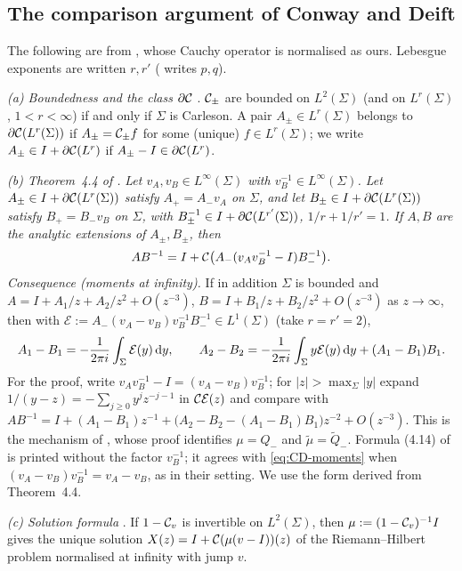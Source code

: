 \subsection{The comparison argument of Conway and Deift}\label{sec:tool-cd}

The following are from \cite[\S4]{CD}, whose Cauchy operator is normalised as ours. Lebesgue exponents are written
$r,r'$ (\cite{CD} writes $p,q$).

\emph{(a) Boundedness and the class $\partial\mathcal{C}$} \cite[\S4.1]{CD}. $\mathcal{C}_\pm$ are bounded on $L^2(\Sigma)$ (and on
$L^r(\Sigma)$, $1<r<\infty$) if and only if $\Sigma$ is Carleson. A pair $A_\pm\in L^r(\Sigma)$ belongs to
$\partial\mathcal{C}(L^r(\Sigma))$ if $A_\pm=\mathcal{C}_\pm f$ for some (unique) $f\in L^r(\Sigma)$; we write $A_\pm\in I+\partial\mathcal{C}(L^r)$ if
$A_\pm-I\in\partial\mathcal{C}(L^r)$.

\emph{(b) Theorem~4.4 of \cite{CD}.} \emph{Let $v_A,v_B\in L^\infty(\Sigma)$ with $v_B^{-1}\in L^\infty(\Sigma)$. Let
$A_\pm\in I+\partial\mathcal{C}(L^r(\Sigma))$ satisfy $A_+=A_-v_A$ on $\Sigma$, and let $B_\pm\in I+\partial\mathcal{C}(L^r(\Sigma))$ satisfy
$B_+=B_-v_B$ on $\Sigma$, with $B_\pm^{-1}\in I+\partial\mathcal{C}(L^{r'}(\Sigma))$, $1/r+1/r'=1$. If $A,B$ are the analytic
extensions of $A_\pm,B_\pm$, then}
\[
  AB^{-1}=I+\mathcal{C}\bigl(A_-(v_Av_B^{-1}-I)B_-^{-1}\bigr).
\]
\emph{Consequence (moments at infinity).} If in addition $\Sigma$ is bounded and $A=I+A_1/z+A_2/z^2+O(z^{-3})$,
$B=I+B_1/z+B_2/z^2+O(z^{-3})$ as $z\to\infty$, then with $\mathcal E:=A_-(v_A-v_B)v_B^{-1}B_-^{-1}\in L^1(\Sigma)$
(take $r=r'=2$),
\begin{equation}\label{eq:CD-moments}
  A_1-B_1=-\frac1{2\pi i}\int_\Sigma\mathcal E(y)\,\mathrm{d} y,\qquad
  A_2-B_2=-\frac1{2\pi i}\int_\Sigma y\mathcal E(y)\,\mathrm{d} y+(A_1-B_1)B_1 .
\end{equation}
For the proof, write $v_Av_B^{-1}-I=(v_A-v_B)v_B^{-1}$; for $|z|>\max_\Sigma|y|$ expand $1/(y-z)=-\sum_{j\ge0}y^jz^{-j-1}$ in
$\mathcal{C}\mathcal E(z)$ and compare with $AB^{-1}=I+(A_1-B_1)z^{-1}+\bigl(A_2-B_2-(A_1-B_1)B_1\bigr)z^{-2}+O(z^{-3})$.
This is the mechanism of \cite[Proposition~4.9]{CD}, whose proof identifies $\mu=Q_-$ and $\tilde\mu=\tilde Q_-$.
Formula (4.14) of \cite{CD} is printed without the factor $v_B^{-1}$; it agrees with \eqref{eq:CD-moments} when
$(v_A-v_B)v_B^{-1}=v_A-v_B$, as in their setting. We use the form derived from Theorem~4.4.

\emph{(c) Solution formula} \cite[\S4.2]{CD}. If $1-\mathcal{C}_{v}$ is invertible on $L^2(\Sigma)$, then
$\mu:=(1-\mathcal{C}_v)^{-1}I$ gives the unique solution $X(z)=I+\mathcal{C}(\mu(v-I))(z)$ of the Riemann--Hilbert problem
normalised at infinity with jump $v$.

